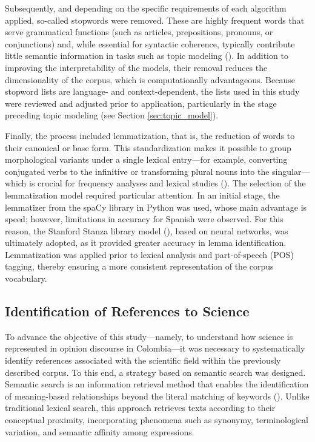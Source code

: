 \documentclass[11pt,a4paper]{article}
\begin{document}
		Subsequently, and depending on the specific requirements of each algorithm applied, so-called stopwords were removed. These are highly frequent words that serve grammatical functions (such as articles, prepositions, pronouns, or conjunctions) and, while essential for syntactic coherence, typically contribute little semantic information in tasks such as topic modeling (\cite{Siino2024}). In addition to improving the interpretability of the models, their removal reduces the dimensionality of the corpus, which is computationally advantageous. Because stopword lists are language- and context-dependent, the lists used in this study were reviewed and adjusted prior to application, particularly in the stage preceding topic modeling (see Section \ref{sec:topic_model}).
		
	
		Finally, the process included lemmatization, that is, the reduction of words to their canonical or base form. This standardization makes it possible to group morphological variants under a single lexical entry—for example, converting conjugated verbs to the infinitive or transforming plural nouns into the singular—which is crucial for frequency analyses and lexical studies (\cite{Orellana2018}). The selection of the lemmatization model required particular attention. In an initial stage, the lemmatizer from the spaCy library in Python was used, whose main advantage is speed; however, limitations in accuracy for Spanish were observed. For this reason, the Stanford Stanza library model (\cite{qi2020stanza}), based on neural networks, was ultimately adopted, as it provided greater accuracy in lemma identification. Lemmatization was applied prior to lexical analysis and part-of-speech (POS) tagging, thereby ensuring a more consistent representation of the corpus vocabulary.

	
	\subsection{Identification of References to Science}
	
	
To advance the objective of this study—namely, to understand how science is represented in opinion discourse in Colombia—it was necessary to systematically identify references associated with the scientific field within the previously described corpus. To this end, a strategy based on semantic search was designed. Semantic search is an information retrieval method that enables the identification of meaning-based relationships beyond the literal matching of keywords (\cite{Wei2022}). Unlike traditional lexical search, this approach retrieves texts according to their conceptual proximity, incorporating phenomena such as synonymy, terminological variation, and semantic affinity among expressions.
\end{document}
